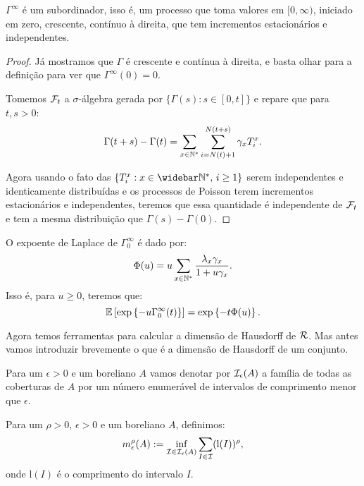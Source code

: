 \begin{proposicao}
  $\Gamma^\infty$ é um subordinador, isso é, um processo que toma
  valores em $[0, \infty)$, iniciado em zero, crescente, contínuo à
  direita, que tem incrementos estacionários e independentes.
\end{proposicao}
\begin{proof}

  Já mostramos que $\Gamma$ é crescente e contínua à direita, e basta
  olhar para a definição para ver que $\Gamma^\infty(0) = 0$.

  Tomemos ${\mathcal{F}}_t$ a $\sigma$-álgebra gerada por $\{ \Gamma(s): s \in [0,
  t]\}$ e repare que para $t, s > 0$:
  \begin{displaymath}
    \Gamma(t+s) - \Gamma(t) = \sum_{x \in {\mathbb{N^*}}} \sum_{i =
      N(t)+1}^{N(t+s)} \gamma_x T_i^x.
  \end{displaymath}

  Agora usando o fato das $\{ T_i^x: x \in \Nzb, \, i \geq 1\}$ serem
  independentes e identicamente distribuídas e os processos de Poisson
  terem incrementos estacionários e independentes, teremos que essa
  quantidade é independente de ${\mathcal{F}}_t$ e tem a mesma distribuição que
  $\Gamma(s) - \Gamma(0)$.
\end{proof}

\begin{proposicao}
  O expoente de Laplace de $\Gamma^\infty_0$ é dado por:
  \begin{displaymath}
    \Phi(u) = u \sum_{x \in {\mathbb{N^*}}} \frac{\lambda_x \gamma_x}{1 + u\gamma_x}.
  \end{displaymath}
  Isso é, para $u \geq 0$, teremos que:
  \begin{displaymath}
    {\mathbb{E}} \left[
      \exp \left\{
        -u \Gamma^\infty_0 (t)
      \right\}
    \right] = 
    \exp\left\{
      -t \Phi(u)
    \right\}.
  \end{displaymath}
\end{proposicao}

Agora temos ferramentas para calcular a dimensão de Hausdorff de
${\mathcal{R}}$. Mas antes vamos introduzir brevemente o que é a dimensão de
Hausdorff de um conjunto.

Para um $\epsilon > 0$ e um boreliano $A$ vamos denotar por
${\mathcal{I}}_\epsilon(A)$ a família de todas as coberturas de $A$ por um
número enumerável de intervalos de comprimento menor que $\epsilon$.


Para um $\rho > 0$, $\epsilon > 0$ e um boreliano $A$, definimos:
\begin{equation}
  \label{eq:dim-hausdorff-eps}
  m^\rho_\epsilon(A) := \inf_{{\mathcal{I}} \in {\mathcal{I}}_\epsilon(A)} 
  \sum_{I \in {\mathcal{I}}} (\mathrm{l}(I))^\rho, 
\end{equation}
onde  $\mathrm{l}(I)$ é o comprimento do intervalo $I$.

